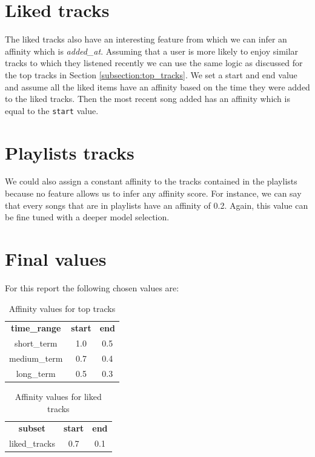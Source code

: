 \section{Liked tracks}
The liked tracks also have an interesting feature from which we can infer an affinity which is \textit{added\_at}. Assuming that a user is more likely to enjoy similar tracks to which they listened recently we can use the same logic as discussed for the top tracks in Section \ref{subsection:top_tracks}. We set a start and end value and assume all the liked items have an affinity based on the time they were added to the liked tracks. Then the most recent song added has an affinity which is equal to the \texttt{start} value.

\section{Playlists tracks}
We could also assign a constant affinity to the tracks contained in the playlists because no feature allows us to infer any affinity score. For instance, we can say that every songs that are in playlists have an affinity of 0.2. Again, this value can be fine tuned with a deeper model selection.

\section{Final values}
For this report the following chosen values are:
\begin{table}[ht]
    \centering
    \begin{tabular}{c|c|c}
        \textbf{time\_range} & \textbf{start} & \textbf{end} \\
        short\_term & 1.0 & 0.5 \\
        medium\_term & 0.7 & 0.4 \\
        long\_term & 0.5 & 0.3 \\
    \end{tabular}
    \caption{Affinity values for top tracks}
    \label{tab:top_tracks_values}
\end{table}

\begin{table}[ht]
    \centering
    \begin{tabular}{c|c|c}
        \textbf{subset} & \textbf{start} & \textbf{end} \\
        liked\_tracks & 0.7 & 0.1 \\
    \end{tabular}
    \caption{Affinity values for liked tracks}
    \label{tab:liked_tracks_values}
\end{table}

